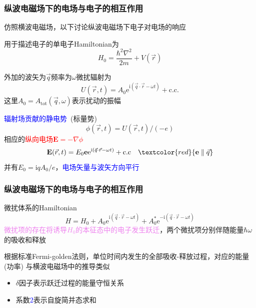 \frame
{
	\frametitle{纵波电磁场下的电场与电子的相互作用}
仿照横波电磁场，以下讨论纵波电磁场下电子对电场的响应

用于描述电子的单电子\textrm{Hamiltonian}为
\begin{displaymath}
	H_0=\frac{\hbar^2{\nabla}^2}{2m}+V(\vec r)
\end{displaymath}

外加的波矢为$\vec q$频率为$\omega$微扰辐射为
\begin{displaymath}
	U(\vec r,t)=A_0\mathrm{e}^{\mathrm{i}(\vec q\cdot\vec r-\omega t)}+\mathrm{c.c.}
\end{displaymath}
这里$A_0=A_{\mathrm{tot}}(\vec q,\omega)$表示扰动的振幅

\textcolor{blue}{辐射场贡献的静电势}~(标量势)
\begin{displaymath}
	\phi(\vec r,t)=U(\vec r,t)/(-e)
\end{displaymath}
相应的\textcolor{red}{纵向电场$\mathbf{E}=-\nabla\phi$}
\begin{displaymath}
	\mathbf{E}(\vec r,t)=E_0\mathbf{e}\mathrm{e}^{\mathrm{i}(\vec q\cdot\vec r-\omega t)}+\mathrm{c.c}\quad\textcolor{red}{\mathbf{e}\parallel\vec q}
\end{displaymath}
并有$E_0=\mathrm{i}qA_0/e$，\textcolor{blue}{电场矢量与波矢方向平行}
}

\frame
{
	\frametitle{纵波电磁场下的电场与电子的相互作用}
微扰体系的\textrm{Hamiltonian}
\begin{displaymath}
	H=H_0+A_0\mathrm{e}^{\mathrm{i}(\vec q\cdot\vec r-\omega t)}+A_0^{\ast}\mathrm{e}^{-\mathrm{i}(\vec q\cdot\vec r-\omega t)}
\end{displaymath}
\textcolor{violet}{微扰项的存在将诱导$H_0$的本征态中的电子发生跃迁}，两个微扰项分别伴随能量$\hbar\omega$的吸收和释放

根据标准\textrm{Fermi-golden}法则，单位时间内发生的全部吸收-释放过程，对应的能量(功率)
{\fontsize{9.0pt}{6.2pt}}
与横波电磁场中的推导类似
\begin{itemize}
	\item $\delta$因子表示跃迁过程的能量守恒关系
	\item 系数\textcolor{blue}{$2$}表示自旋简并态求和
\end{itemize}
}

